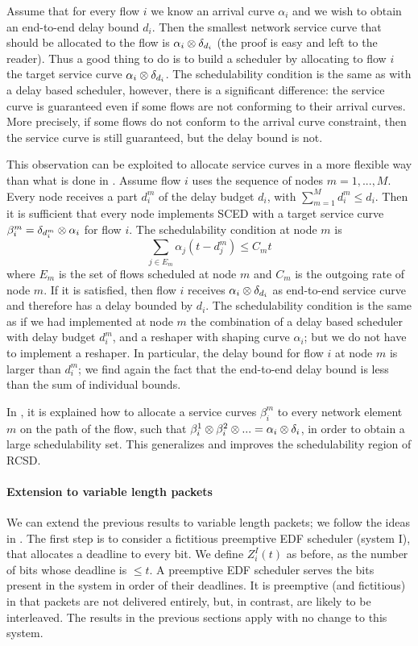 Assume that for every flow $i$ we know an arrival curve $\alpha_i$
and we wish to obtain an end-to-end delay bound $d_i$. Then the
smallest network service curve that should be allocated to the
flow is $\alpha_i \otimes \delta_{d_i}$ (the proof is easy and left
to the reader). Thus a good thing to do is to build a scheduler by
allocating to flow $i$ the target service curve $\alpha_i \otimes
\delta_{d_i}$. The schedulability condition is the same as with a
delay based scheduler, however, there is a significant difference:
the service curve is guaranteed even if some flows are not
conforming to their arrival curves. More precisely, if some flows
do not conform to the arrival curve constraint, then the service
curve is still guaranteed, but the delay bound is not.

This observation can be exploited to allocate service curves in a
more flexible way than what is done in 
\cite{CruzSCED}. Assume flow $i$ uses the sequence of nodes
$m=1,...,M$. Every node receives a part $d^m_i$ of the delay
budget $d_i$, with $\sum_{m=1}^M d^m_i \leq d_i$. Then it is
sufficient that every node implements SCED with a target service
curve $\beta^m_i= \delta_{d^m_i} \otimes \alpha_i$ for flow $i$. The
schedulability condition at node $m$ is
 $$
 \sum_{j \in E_m} \alpha_j(t-d^m_j) \leq C_m t
 $$
where $E_m$ is the set of flows scheduled at node $m$ and $C_m$ is
the outgoing rate of node $m$. If it is satisfied, then flow $i$
receives $\alpha_i \otimes \delta_{d_i} $ as end-to-end service curve
and therefore has a delay bounded by $d_i$. The schedulability
condition is the same as if we had implemented at node $m$ the
combination of a delay based scheduler with delay budget $d^m_i$,
and a reshaper with shaping curve $\alpha_i$; but we do not have
to implement a reshaper. In particular, the delay bound for flow
$i$ at node $m$ is larger than $d^m_i$; we find again the fact
that the end-to-end delay bound is less than the sum of individual
bounds.

In \cite{saro96}, it is explained how to allocate a service curves
$\beta_i^m$ to every network element $m$ on the path of the flow,
such that $\beta_i^1 \otimes \beta_i^2 \otimes ...= \alpha_i \otimes
\delta_i$, in order to obtain a large schedulability set. This
generalizes and improves the schedulability region of RCSD.

\paragraph{Extension to variable length packets}
We can extend the previous results to variable length packets; we
follow the ideas in \cite{Changbook}. The first step is to
consider a fictitious preemptive EDF scheduler (system I), that
allocates a deadline to every bit. We define $Z_i^{I}(t)$ as
before, as the number of bits whose deadline is $\leq t$. A
preemptive EDF scheduler serves the bits present in the system in
order of their deadlines. It is preemptive (and fictitious) in
that packets are not delivered entirely, but, in contrast, are
likely to be interleaved. The results in the previous sections
apply with no change to this system.


